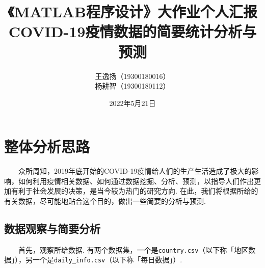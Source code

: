 \documentclass[a4paper, titlepage]{article}
\begin{document}
    \renewcommand{\thefootnote}{\fnsymbol{footnote}}
    \title{{\small《MATLAB程序设计》大作业个人汇报}\\COVID-19疫情数据的简要统计分析与预测\footnotemark[1]}
    \author{王逸扬（19300180016）\\杨耕智（19300180112）{\kaishu }}
    \date{2022年5月21日}
    \maketitle
    \renewcommand{\thefootnote}{\araboc{footnote}}
    \thispagestyle{empty}
    \renewcommand{\contentsname}{\centering 目录\\\quad\\}
    \tableofcontents
    \thispagestyle{empty}
    \newpage
    \pagestyle{headings}
   

    \section{整体分析思路}
        　　众所周知，2019年底开始的COVID-19疫情给人们的生产生活造成了极大的影响，如何利用疫情相关数据、如何通过数据挖掘、分析、预测，以指导人们作出更加有利于社会发展的决策，是当今较为热门的研究方向. 在此，我们将根据所给的有关数据，尽可能地贴合这个目的，做出一些简要的分析与预测.

        \subsection{数据观察与简要分析}
        　　首先，观察所给数据. 有两个数据集，一个是\texttt{country.csv}（以下称「地区数据」），另一个是\texttt{daily\_info.csv}（以下称「每日数据」）. 
\end{document}
